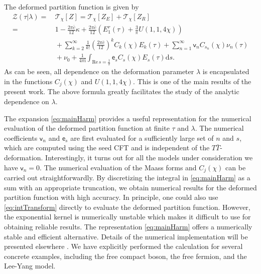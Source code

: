\documentclass[aps,twocolumn,prl,showpacs,amsmath,amssymb,10pt]{revtex4-2}
\def\tc{\bar{c}}
\begin{document}
\vspace{0.3cm}
The deformed partition function is given by
\begin{align}
\label{eq:mainHarm}
\mathcal{Z}(\tau|\lambda)=&\,\mathcal{T}_{\chi}[Z]=\mathcal{T}_{\chi}[Z_E]+\mathcal{T}_{\chi}[Z_R]\\\nonumber
=&\,1-\frac{2\pi \tc}{12}\kappa+\frac{2\pi \tc}{12}\left(E_1^r(\tau)+\frac{3}{\pi}U(1,1,4\chi)\right)\\\nonumber
&\,+\sum_{k=2}^{\infty}\frac{1}{k!}\left(\frac{2\pi \tc}{12}\right)^k C_k(\chi)E_k(\tau)+\sum_{n=1}^{\infty}\mathsf{v}_nC_{s_n}(\chi)\nu_n(\tau)\\\nonumber
&\,+\nu_0+\frac{1}{4\pi\mathrm{i}}\int_{\text{Re}\,s=\frac{1}{2}}\mathsf{e}_s C_s(\chi)E_s(\tau)\mathrm{d}s.
\end{align}
As can be seen, all dependence on the deformation parameter $\lambda$ is encapsulated in the functions $C_j(\chi)$ and $U(1,1,4\chi)$. This is one of the main results of the present work. The above formula greatly facilitates the study of the analytic dependence on $\lambda$.

The expansion \eqref{eq:mainHarm} provides a useful representation for the numerical evaluation of the deformed partition function at finite $\tau$ and $\lambda$. The numerical coefficients $\mathsf{v}_n$ and $\mathsf{e}_s$ are first evaluated for a sufficiently large set of $n$ and $s$, which are computed using the seed CFT and is independent of the $T\bar{T}$-deformation. Interestingly, it turns out for all the models under consideration we have $\mathsf{v}_n=0$. The numerical evaluation of the Maass forms and $C_j(\chi)$ can be carried out straightforwardly. By discretizing the integral in \eqref{eq:mainHarm} as a sum with an appropriate truncation, we obtain numerical results for the deformed partition function with high accuracy. In principle, one could also use \eqref{eq:intTransform} directly to evaluate the deformed partition function. However, the exponential kernel is numerically unstable which makes it difficult to use for obtaining reliable results. The representation \eqref{eq:mainHarm} offers a numerically stable and efficient alternative. Details of the numerical implementation will be presented elsewhere \cite{ToAppear}. We have explicitly performed the calculation for several concrete examples, including the free compact boson, the free fermion, and the Lee-Yang model.
\end{document}
